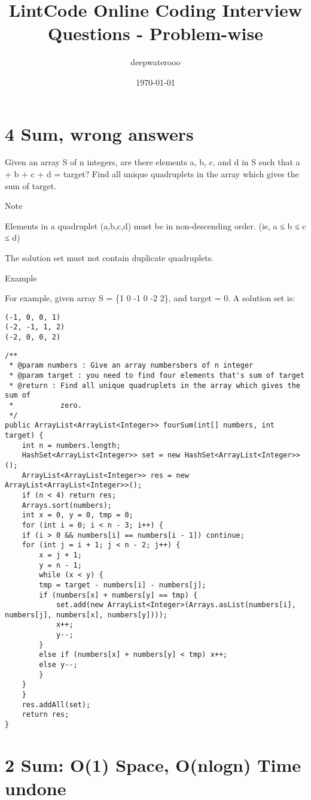 \documentclass[12pt]{book}
\author{deepwaterooo}
\date{\today}
\title{LintCode Online Coding Interview Questions - Problem-wise}
\begin{document}
\maketitle
\tableofcontents


\chapter{4 Sum, wrong answers}
\label{sec-1}

Given an array S of n integers, are there elements a, b, c, and d in S such that a + b + c + d = target? Find all unique quadruplets in the array which gives the sum of target.

Note

Elements in a quadruplet (a,b,c,d) must be in non-descending order. (ie, a ≤ b ≤ c ≤ d)

The solution set must not contain duplicate quadruplets.

Example

For example, given array S = \{1 0 -1 0 -2 2\}, and target = 0. A solution set is:
\lstset{language=java,label= ,caption= ,numbers=none}
\begin{lstlisting}
(-1, 0, 0, 1)
(-2, -1, 1, 2)
(-2, 0, 0, 2)
\end{lstlisting}
\lstset{language=java,label= ,caption= ,numbers=none}
\begin{lstlisting}
/**
 * @param numbers : Give an array numbersbers of n integer
 * @param target : you need to find four elements that's sum of target
 * @return : Find all unique quadruplets in the array which gives the sum of
 *           zero.
 */
public ArrayList<ArrayList<Integer>> fourSum(int[] numbers, int target) {     
    int n = numbers.length;
    HashSet<ArrayList<Integer>> set = new HashSet<ArrayList<Integer>>();
    ArrayList<ArrayList<Integer>> res = new ArrayList<ArrayList<Integer>>();
    if (n < 4) return res;
    Arrays.sort(numbers);
    int x = 0, y = 0, tmp = 0;
    for (int i = 0; i < n - 3; i++) {
	if (i > 0 && numbers[i] == numbers[i - 1]) continue;
	for (int j = i + 1; j < n - 2; j++) {
	    x = j + 1;
	    y = n - 1;
	    while (x < y) {
		tmp = target - numbers[i] - numbers[j];
		if (numbers[x] + numbers[y] == tmp) {
		    set.add(new ArrayList<Integer>(Arrays.asList(numbers[i], numbers[j], numbers[x], numbers[y])));
		    x++;
		    y--;
		}
		else if (numbers[x] + numbers[y] < tmp) x++;
		else y--;
	    }
	}
    }
    res.addAll(set);
    return res;
}
\end{lstlisting}
\chapter{2 Sum: O(1) Space, O(nlogn) Time undone}
\label{sec-2}
\end{document}
